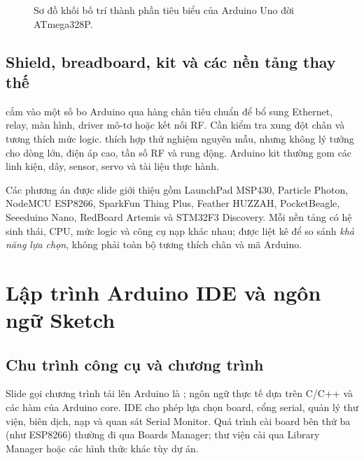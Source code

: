 \begin{figure}[htbp]\centering
{}
\caption{Sơ đồ khối bố trí thành phần tiêu biểu của Arduino Uno đời ATmega328P.}
\end{figure}

\subsection{Shield, breadboard, kit và các nền tảng thay thế}
 cắm vào một số bo Arduino qua hàng chân tiêu chuẩn để bổ sung Ethernet, relay, màn hình, driver mô-tơ hoặc kết nối RF. Cần kiểm tra xung đột chân và tương thích mức logic.  thích hợp thử nghiệm nguyên mẫu, nhưng không lý tưởng cho dòng lớn, điện áp cao, tần số RF và rung động. Arduino kit thường gom các linh kiện, dây, sensor, servo và tài liệu thực hành.

Các phương án được slide giới thiệu gồm LaunchPad MSP430, Particle Photon, NodeMCU ESP8266, SparkFun Thing Plus, Feather HUZZAH, PocketBeagle, Seeeduino Nano, RedBoard Artemis và STM32F3 Discovery. Mỗi nền tảng có hệ sinh thái, CPU, mức logic và công cụ nạp khác nhau; được liệt kê để so sánh \emph{khả năng lựa chọn}, không phải toàn bộ tương thích chân và mã Arduino.

\section{Lập trình Arduino IDE và ngôn ngữ Sketch}
\subsection{Chu trình công cụ và chương trình}
Slide gọi chương trình tải lên Arduino là ; ngôn ngữ thực tế dựa trên C/C++ và các hàm của Arduino core. IDE cho phép lựa chọn board, cổng serial, quản lý thư viện, biên dịch, nạp và quan sát Serial Monitor. Quá trình cài board bên thứ ba (như ESP8266) thường đi qua Boards Manager; thư viện cài qua Library Manager hoặc các hình thức khác tùy dự án.

